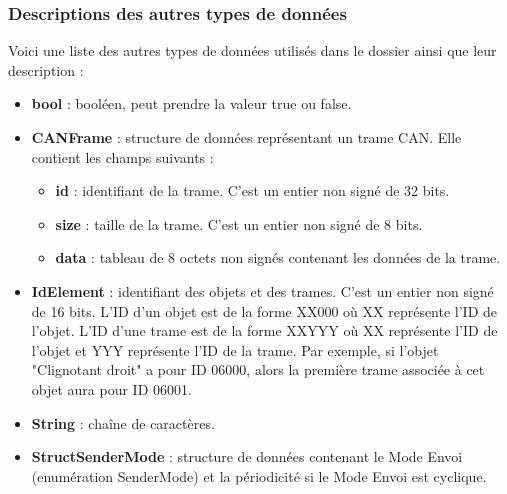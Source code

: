 \subsubsection{Descriptions des autres types de données}

Voici une liste des autres types de données utilisés dans le dossier ainsi que leur description :
\begin{itemize}
    \item \textbf{bool} : booléen, peut prendre la valeur true ou false.
    \item \textbf{CANFrame} : structure de données représentant un trame CAN. Elle contient les champs suivants :
    \begin{itemize}
        \item \textbf{id} : identifiant de la trame. C'est un entier non signé de 32 bits.
        \item \textbf{size} : taille de la trame. C'est un entier non signé de 8 bits.
        \item \textbf{data} : tableau de 8 octets non signés contenant les données de la trame.
    \end{itemize}
    \item \textbf{IdElement} : identifiant des objets et des trames. C'est un entier non signé de 16 bits. L'ID d'un objet est de la forme XX000 où XX représente l'ID de l'objet. L'ID d'une trame est de la forme XXYYY où XX représente l'ID de l'objet et YYY représente l'ID de la trame. Par exemple, si l'objet "Clignotant droit" a pour ID 06000, alors la première trame associée à cet objet aura pour ID 06001.
    \item \textbf{String} : chaîne de caractères.
    \item \textbf{StructSenderMode} : structure de données contenant le Mode Envoi (enumération SenderMode) et la périodicité si le Mode Envoi est cyclique.
\end{itemize}